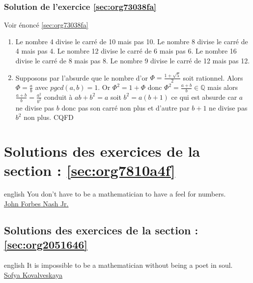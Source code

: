 \documentclass[a4paper, 11pt, twoside]{book}
\newcommand{\Q}{\mathbb{Q}}
\begin{document}
\section{Solution de l'exercice \ref{sec:org73038fa}}
\label{sec:org77e137f}
Voir énoncé \ref{sec:org73038fa}

\begin{enumerate}
\item Le nombre 4 divise le carré de 10 mais pas 10. Le nombre 8
divise le carré de 4 mais pas 4. Le nombre 12 divise le carré
de 6 mais pas 6. Le nombre 16 divise le carré de 8 mais
pas 8. Le nombre 9 divise le carré de 12 mais pas 12.
\item Supposons par l'absurde que le nombre d'or \(\Phi = \frac{1 +
       \sqrt{5}}{2}\) soit rationnel. Alors \(\Phi = \frac{a}{b}\) avec
\(pgcd(a, b) = 1\). Or \(\Phi^2 = 1 + \Phi\) donc \(\Phi^2 =
       \frac{a + b}{b}\in\Q\) mais alors \(\frac{a + b}{b} =
       \frac{a^2}{b^2}\) conduit à \(ab + b^2 = a\) soit \(b^2 = a(b+1)\)
ce qui est absurde car \(a\) ne divise pas \(b\) donc pas son carré
non plus et d'autre par \(b + 1\) ne divise pas \(b^2\) non plus. CQFD
\end{enumerate}
\stopcontents[level-2]
\stopcontents[level-1]

\part{Solutions des exercices de la section : \ref{sec:org7810a4f}}
\label{sec:org1980f56}
\startcontents[level-1]
\begin{foreigndisplayquote}{english}
You don’t have to be a mathematician to have a feel for numbers.\\

\href{https://en.wikipedia.org/wiki/John\_Forbes\_Nash\_Jr.}{John Forbes Nash Jr.}
\end{foreigndisplayquote}

\chapter{Solutions des exercices de la section : \ref{sec:org2051646}}
\label{sec:org448c6a2}
\startcontents[level-2]

\begin{foreigndisplayquote}{english}
It is impossible to be a mathematician without being a poet in soul.\\

\href{https://en.wikipedia.org/wiki/Sofya\_Kovalevskaya}{Sofya Kovalveskaya}
\end{foreigndisplayquote}
\end{document}
